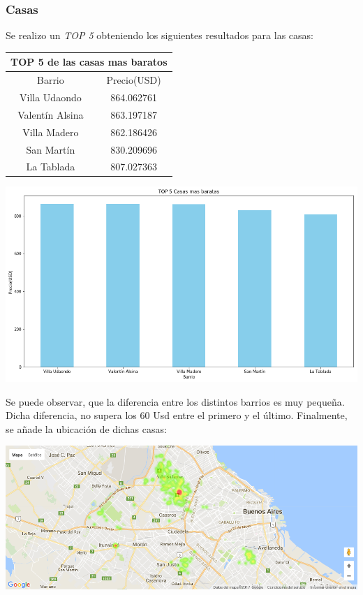 \documentclass[a4paper, 10pt]{article}
\begin{document}
				\subsubsection{Casas}

				Se realizo un \emph{TOP 5} obteniendo los siguientes resultados para las casas:

					\begin{center}
						\begin{tabular}{ |c|c| }
							\hline
							\multicolumn{2}{|c|}{TOP 5 de las casas mas baratos}\\
							\hline
							\hline
							Barrio & Precio(USD)\\
							\hline
							Villa Udaondo & 864.062761 \\
							Valentín Alsina 	& 863.197187 \\
							Villa Madero & 862.186426 \\
							San Martín & 830.209696 \\
							La Tablada & 807.027363 \\
							\hline
						\end{tabular}
					\end{center}


				\begin{center}
   		    				\includegraphics[width=\textwidth]{images/topCb}
				\end{center}

				Se puede observar, que la diferencia entre los distintos barrios es muy pequeña. Dicha diferencia, no supera los 60 Usd entre el primero y el último.
				Finalmente, se añade la ubicación de dichas casas:

				\begin{center}
   		    				\includegraphics[width=\textwidth]{images/ubicCb}
				\end{center}
\end{document}
